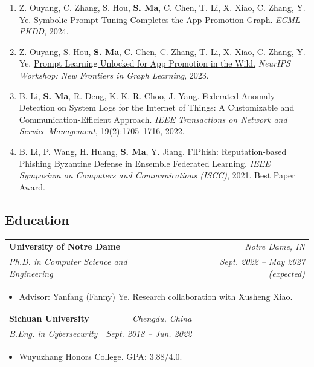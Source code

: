 \documentclass[10pt,letterpaper]{article}
\makeatletter
\newenvironment{sectionbody}{\begin{list}{}{\setlength{\leftmargin}{12pt}\setlength{\rightmargin}{0pt}\setlength{\topsep}{0pt}\setlength{\partopsep}{0pt}\setlength{\parsep}{0pt}\setlength{\itemsep}{0pt}}\item[]}{\end{list}}
\newcommand{\entry}[4]{\begin{tabularx}{\linewidth}{@{}Xr@{}}\textbf{#1}&\textit{#2}\\\textit{#3}&\textit{#4}\end{tabularx}}
\newcommand{\me}{\textbf{S. Ma}}
\makeatother
\begin{document}
\begin{sectionbody}
\begin{enumerate}
\textit{Network and Distributed System Security (NDSS) Symposium}, 2025.
\item\label{pub:symbolic} Z. Ouyang, C. Zhang, S. Hou, \me, C. Chen, T. Li, X. Xiao, C. Zhang, Y. Ye.
\href{https://link.springer.com/chapter/10.1007/978-3-031-70381-2_12}{Symbolic Prompt Tuning Completes the App Promotion Graph.}
\textit{ECML PKDD}, 2024.
\item\label{pub:prompt} Z. Ouyang, S. Hou, \me, C. Chen, C. Zhang, T. Li, X. Xiao, C. Zhang, Y. Ye.
\href{https://openreview.net/forum?id=JTRErQb2oN}{Prompt Learning Unlocked for App Promotion in the Wild.}
\textit{NeurIPS Workshop: New Frontiers in Graph Learning}, 2023.
\item\label{pub:federated} B. Li, \me, R. Deng, K.-K. R. Choo, J. Yang.
Federated Anomaly Detection on System Logs for the Internet of Things: A Customizable and Communication-Efficient Approach.
\textit{IEEE Transactions on Network and Service Management}, 19(2):1705--1716, 2022.
\item\label{pub:flphish} B. Li, P. Wang, H. Huang, \me, Y. Jiang.
FlPhish: Reputation-based Phishing Byzantine Defense in Ensemble Federated Learning.
\textit{IEEE Symposium on Computers and Communications (ISCC)}, 2021. Best Paper Award.
\end{enumerate}
\end{sectionbody}

\begin{samepage}
\section{Education}
\begin{sectionbody}
\entry{University of Notre Dame}{Notre Dame, IN}{Ph.D. in Computer Science and Engineering}{Sept. 2022 -- May 2027 (expected)}
\begin{itemize}
\item Advisor: Yanfang (Fanny) Ye. Research collaboration with Xusheng Xiao.
\end{itemize}
\vspace{3pt}
\entry{Sichuan University}{Chengdu, China}{B.Eng. in Cybersecurity}{Sept. 2018 -- Jun. 2022}
\begin{itemize}\item Wuyuzhang Honors College. GPA: 3.88/4.0.\end{itemize}
\end{sectionbody}

\end{samepage}
\end{document}
